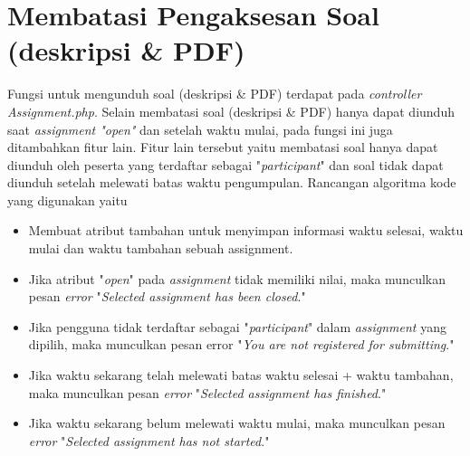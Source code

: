 \section{Membatasi Pengaksesan Soal (deskripsi \& PDF)}%
\label{chap:batassoal}
Fungsi untuk mengunduh soal (deskripsi \& PDF) terdapat pada \textit{controller Assignment.php}. Selain membatasi soal (deskripsi \& PDF) hanya dapat diunduh saat \textit{assignment "open"} dan setelah waktu mulai, pada fungsi ini juga ditambahkan fitur lain. Fitur lain tersebut yaitu membatasi soal hanya dapat diunduh oleh peserta yang terdaftar sebagai "\textit{participant}" dan soal tidak dapat diunduh setelah melewati batas waktu pengumpulan. Rancangan algoritma kode yang digunakan yaitu
\begin{itemize}
	\item Membuat atribut tambahan untuk menyimpan informasi waktu selesai, waktu mulai dan waktu tambahan sebuah assignment.
	\item Jika atribut "\textit{open}" pada \textit{assignment} tidak memiliki nilai, maka munculkan pesan \textit{error} "\textit{Selected assignment has been closed}."
	\item Jika pengguna tidak terdaftar sebagai "\textit{participant}" dalam \textit{assignment} yang dipilih, maka munculkan pesan error "\textit{You are not registered for submitting}."
	\item Jika waktu sekarang telah melewati batas waktu selesai + waktu tambahan, maka munculkan pesan \textit{error} "\textit{Selected assignment has finished}."
	\item Jika waktu sekarang belum melewati waktu mulai, maka munculkan pesan \textit{error} "\textit{Selected assignment has not started}."	
\end{itemize}

